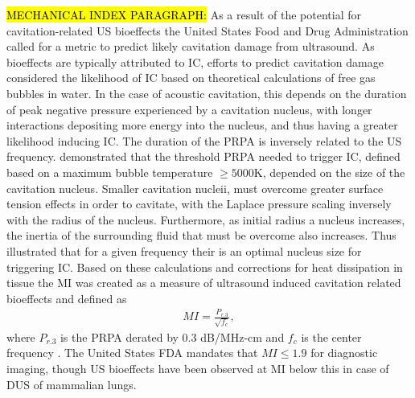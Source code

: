 \hl{
 MECHANICAL INDEX PARAGRAPH:} As a result of the potential for
  cavitation-related \ac{US} bioeffects the United States Food and
  Drug Administration called for a metric to predict likely cavitation
  damage from ultrasound. As bioeffects are typically attributed to
  \ac{IC}, efforts to predict cavitation damage considered the
  likelihood of \ac{IC} based on theoretical calculations of free gas
  bubbles in water. In the case of acoustic cavitation, this depends
  on the duration of peak negative pressure experienced by a
  cavitation nucleus, with longer interactions depositing more energy
  into the nucleus, and thus having a greater likelihood inducing
  \ac{IC}. The duration of the \ac{PRPA} is inversely related to the
  \ac{US} frequency. \cite{Holland1989} demonstrated that the
  threshold \ac{PRPA} needed to trigger \ac{IC}, defined based on a
  maximum bubble temperature $\geq5000$K, depended on the size of the
  cavitation nucleus. Smaller cavitation nucleii, must overcome
  greater surface tension effects in order to cavitate, with the
  Laplace pressure scaling inversely with the radius of the
  nucleus. Furthermore, as initial radius a nucleus increases, the
  inertia of the surrounding fluid that must be overcome also
  increases\cite{AiumS72000}. Thus \cite{Holland1989} illustrated that
  for a given frequency their is an optimal nucleus size for
  triggering \ac{IC}. Based on these calculations and corrections for
  heat dissipation in tissue the \ac{MI} was created as a measure of
  ultrasound induced cavitation related bioeffects and defined as 
  \begin{align}
    MI = \frac{P_{r.3}}{\sqrt{f_c}},
  \end{align}
  where $P_{r.3}$ is the \ac{PRPA} derated by $0.3$ dB/MHz-cm and
  $f_c$ is the center frequency \cite{Apfel1991}. The United States
  \ac{FDA} mandates that $MI\leq1.9$ for diagnostic imaging, though
  \ac{US} bioeffects have been observed at \ac{MI} below this in case
  of \ac{DUS} of mammalian lungs.


